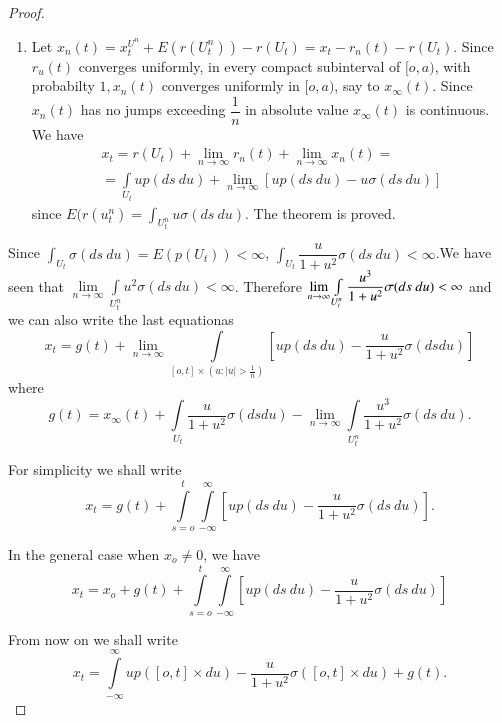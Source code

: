 \begin{proof}
\begin{enumerate}
\item Let $x_n(t) = x^{U^n}_t + E(r(U^n_t)) - r(U_t) = x_t - r_n
   (t) - r(U_t)$. Since $r_u(t)$ converges uniformly, in every compact
   subinterval of $[o,a)$, with probabilty $1, x_n(t)$ converges
   uniformly in $[o,a)$, say to $x_\infty (t)$. Since $x_n(t)$ has
   no jumps exceeding $\dfrac{1}{n}$ in absolute value $x_\infty
   (t)$ is continuous. We have   
   \begin{multline*}
     x_t = r(U_t) +  \lim_{n \to \infty} r_n(t) +  \lim_{n \to
       \infty} x_n (t)=\\ 
     = \int\limits_{U_t} u p (ds\ du) + \lim_{ n \to
       \infty}[u p (ds\ du) - u \sigma(ds\ du)] 
   \end{multline*}
 since $E(r(u^n_t) = \int_{U^n_t} u \sigma (ds\ du)$. The theorem is proved.
 \end{enumerate} 

Since  $\int_{U_t} \sigma (ds\ du )= E(p(U_t)) < \infty$, $\int_{U_t}
 \dfrac{u}{1+u^2} \sigma (ds\ du) < \infty$.\break We have seen that
 $\lim\limits_{n \to \infty}\int\limits_{U_t^n} u^2 \sigma (ds\ du) <
 \infty$. Therefore $\lim\limits_{n \to \infty}
 \int\limits_{U_t^n}\dfrac{u^3}{1+u^2}\break \sigma (ds\ du) < \infty$ and we
 can also write the last equation\pageoriginale as  
 $$
x_t=g(t) + \lim\limits_{n \to \infty} \int\limits_{[o,t] \times (u: | u| >
     \frac{1}{n})} \left[u  p(ds\ du) - \frac{u}{1+u^2} \sigma (ds
     du)\right]
$$
where
$$
g(t) = x_\infty (t) +  \int\limits_{U_t}
   \frac{u}{1+u^2} \sigma (ds 
   du)- \lim_{n \to \infty} \int\limits_{U_t^n} \frac{u^3}{1+u^2} \sigma
   (ds\ du).
$$ 
 
For simplicity we shall write
$$
x_t =g(t) +  \int\limits_{s=o}^t \int\limits_{- \infty}^\infty \left[u p(ds\ du)-
  \frac{u}{1+u^2} \sigma (ds\ du)\right]. 
$$
 
In the general case when $x_o \neq 0$, we have
$$
x_t = x_o +  g(t) +    \int\limits_{s=o}^t \int\limits_{- \infty}^\infty \left[u
  p(ds\ du)- \frac{u}{1+u^2} \sigma (ds\ du)\right] 
$$
 
From  now on we shall write
 $$
 x_t = \int\limits_{- \infty}^\infty u p ( [o,t]\times du ) - \frac{u}{1+
   u^2} \sigma ([o,t] \times du) + g(t).  
 $$
 

\end{proof}
